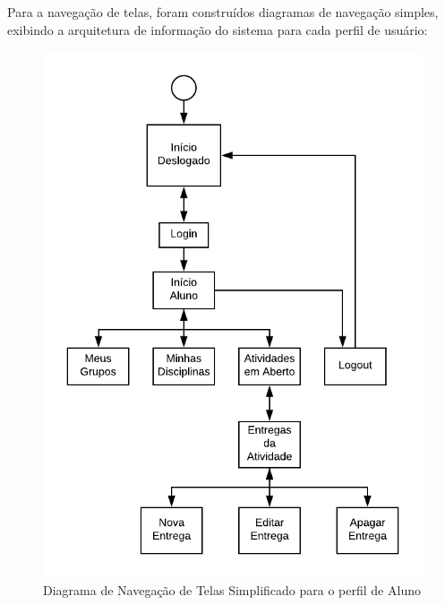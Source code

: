 Para a navegação de telas, foram construídos diagramas de navegação simples, exibindo a arquitetura de informação do sistema para cada perfil de usuário:

\begin{figure}[H]
    \centering
    \includegraphics[scale=1]{imagens/telas_aluno.png}
    \caption{Diagrama de Navegação de Telas Simplificado para o perfil de Aluno}
    \label{fig:telas-aluno}
\end{figure}

